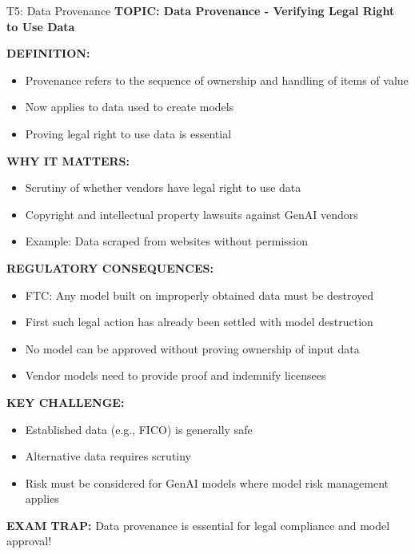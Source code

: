 \documentclass[8pt]{beamer}
\begin{document}
	\begin{frame}{T5: Data Provenance}
		\fontsize{6.5}{7.5}\selectfont
		\textbf{TOPIC: Data Provenance - Verifying Legal Right to Use Data}
		
		\vspace{0.1cm}
		\textbf{DEFINITION:}
		\begin{itemize}
			\item Provenance refers to the sequence of ownership and handling of items of value
			\item Now applies to data used to create models
			\item Proving legal right to use data is essential
		\end{itemize}
		
		\vspace{0.1cm}
		\textbf{WHY IT MATTERS:}
		\begin{itemize}
			\item Scrutiny of whether vendors have legal right to use data
			\item Copyright and intellectual property lawsuits against GenAI vendors
			\item Example: Data scraped from websites without permission
		\end{itemize}
		
		\vspace{0.1cm}
		\textbf{REGULATORY CONSEQUENCES:}
		\begin{itemize}
			\item FTC: Any model built on improperly obtained data must be destroyed
			\item First such legal action has already been settled with model destruction
			\item No model can be approved without proving ownership of input data
			\item Vendor models need to provide proof and indemnify licensees
		\end{itemize}
		
		\vspace{0.1cm}
		\textbf{KEY CHALLENGE:}
		\begin{itemize}
			\item Established data (e.g., FICO) is generally safe
			\item Alternative data requires scrutiny
			\item Risk must be considered for GenAI models where model risk management applies
		\end{itemize}
		
		\textcolor{myred}{\textbf{EXAM TRAP:}} Data provenance is \textcolor{myblue}{essential for legal compliance and model approval}!
	\end{frame}
	
\end{document}

